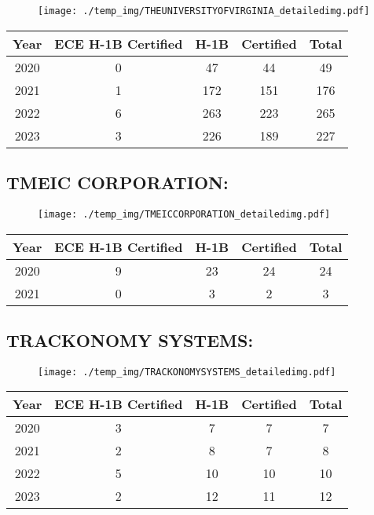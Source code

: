 \documentclass{article}%
\begin{document}
\begin{figure}[htbp]%
\centering%
\texttt{[image: ./temp\_img/THEUNIVERSITYOFVIRGINIA\_detailedimg.pdf]}%
\end{figure}

%
\begin{longtable}{c|c|c|c|c}%
\hline%
Year&ECE H{-}1B Certified&H{-}1B&Certified&Total\\%
\hline%
2020&0&47&44&49\\%
\hline%
2021&1&172&151&176\\%
\hline%
2022&6&263&223&265\\%
\hline%
2023&3&226&189&227\\%
\hline%
\end{longtable}

%
\newpage%
\subsection{TMEIC CORPORATION:}%
\label{subsec:TMEICCORPORATION}%
\label{TMEICCORPORATIONdetailed}%


\begin{figure}[htbp]%
\centering%
\texttt{[image: ./temp\_img/TMEICCORPORATION\_detailedimg.pdf]}%
\end{figure}

%
\begin{longtable}{c|c|c|c|c}%
\hline%
Year&ECE H{-}1B Certified&H{-}1B&Certified&Total\\%
\hline%
2020&9&23&24&24\\%
\hline%
2021&0&3&2&3\\%
\hline%
\end{longtable}

%
\newpage%
\subsection{TRACKONOMY SYSTEMS:}%
\label{subsec:TRACKONOMYSYSTEMS}%
\label{TRACKONOMYSYSTEMSdetailed}%


\begin{figure}[htbp]%
\centering%
\texttt{[image: ./temp\_img/TRACKONOMYSYSTEMS\_detailedimg.pdf]}%
\end{figure}

%
\begin{longtable}{c|c|c|c|c}%
\hline%
Year&ECE H{-}1B Certified&H{-}1B&Certified&Total\\%
\hline%
2020&3&7&7&7\\%
\hline%
2021&2&8&7&8\\%
\hline%
2022&5&10&10&10\\%
\hline%
2023&2&12&11&12\\%
\hline%
\end{longtable}
\end{document}

